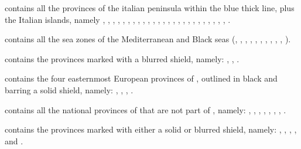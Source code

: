 \begin{deflist}
\item[\anchorregion{Italie}] contains all the provinces of the italian
  peninsula within the blue thick line, plus the Italian islands, namely
  , , ,
  , , ,
  , , , ,
  , , , ,
  , , , ,
  , , ,
  , , ,
  , .
\item[\anchorregion{Mediterranee}] contains all the sea zones of the
  Mediterranean and Black seas (, ,
  , , \seazoneLevantin,
  , , ,
  \seazoneGabes, , \seazoneAlboran). %
\item[\anchorregion{Norvege}] contains the provinces marked with a blurred
   shield, namely: ,
  , .
\item[\anchorregion{Perse}] contains the four easternmost European provinces
  of , outlined in black and barring a solid 
  shield, namely: , , ,
  .
\item[\anchorregion{Suede}] contains all the national provinces of
   that are not part of , namely:
  , , ,
  , , ,
  , .
\item[\anchorregion{Ukraine}] contains the provinces marked with either a
  solid or blurred  shield, namely: ,
  , , ,
   and .
\end{deflist}


